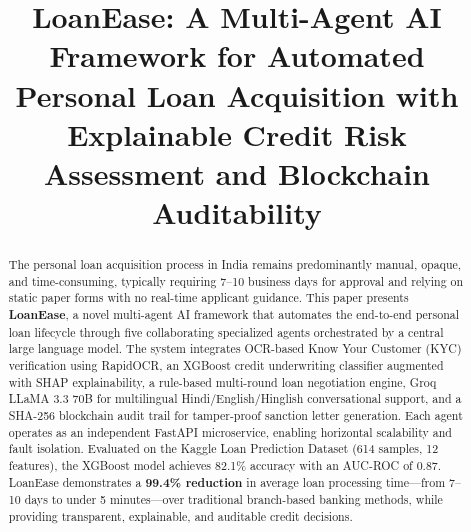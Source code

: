 \documentclass[conference]{IEEEtran}
\begin{document}


\title{LoanEase: A Multi-Agent AI Framework for Automated
Personal Loan Acquisition with Explainable Credit Risk
Assessment and Blockchain Auditability}

\author{
}

\maketitle

\begin{abstract}
The personal loan acquisition process in India remains
predominantly manual, opaque, and time-consuming,
typically requiring 7--10 business days for approval
and relying on static paper forms with no real-time
applicant guidance. This paper presents \textbf{LoanEase},
a novel multi-agent AI framework that automates the
end-to-end personal loan lifecycle through five
collaborating specialized agents orchestrated by a
central large language model. The system integrates
OCR-based Know Your Customer (KYC) verification using
RapidOCR, an XGBoost credit underwriting classifier
augmented with SHAP explainability, a rule-based
multi-round loan negotiation engine, Groq LLaMA 3.3 70B
for multilingual Hindi/English/Hinglish conversational
support, and a SHA-256 blockchain audit trail for
tamper-proof sanction letter generation. Each agent
operates as an independent FastAPI microservice,
enabling horizontal scalability and fault isolation.
Evaluated on the Kaggle Loan Prediction Dataset (614
samples, 12 features), the XGBoost model achieves
82.1\% accuracy with an AUC-ROC of 0.87. LoanEase
demonstrates a \textbf{99.4\% reduction} in average
loan processing time---from 7--10 days to under 5
minutes---over traditional branch-based banking methods,
while providing transparent, explainable, and auditable
credit decisions.
\end{abstract}
\end{document}
